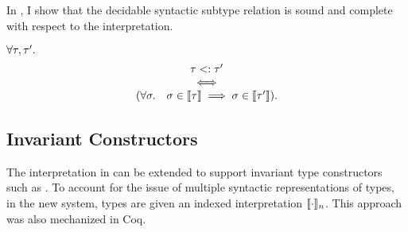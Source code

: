 In \cite{bib:belyakova:minijl-sub:ftfjp:2019}, I show that the decidable 
syntactic subtype relation is sound and complete with respect
to the interpretation.

\begin{theorem}
    $\forall \tau, \tau'.$
    \[
        \begin{array}{c}
            \tau <: \tau' \\
            \iff \\
            (\forall \sigma.\quad \sigma \in \llbracket \tau \rrbracket \implies
                \sigma \in \llbracket \tau' \rrbracket).
        \end{array}
    \]
\end{theorem}

\subsection{Invariant Constructors}

The interpretation in  can be extended to support
invariant type constructors such as .
To account for the issue of multiple syntactic representations of types,
in the new system, types are given an indexed interpretation $\llbracket \cdot \rrbracket_n$.
This approach was also mechanized in Coq.

